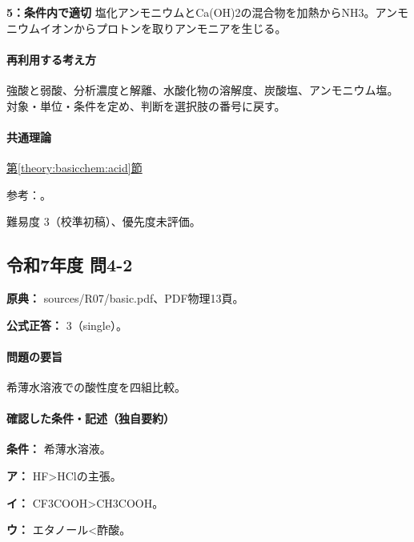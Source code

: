 \noindent\textbf{5：条件内で適切} 塩化アンモニウムとCa(OH)2の混合物を加熱からNH3。アンモニウムイオンからプロトンを取りアンモニアを生じる。\par

\paragraph{再利用する考え方} 強酸と弱酸、分析濃度と解離、水酸化物の溶解度、炭酸塩、アンモニウム塩。 対象・単位・条件を定め、判断を選択肢の番号に戻す。

\paragraph{共通理論} \hyperref[theory:basicchem:acid]{第\ref*{theory:basicchem:acid}節}

\par 参考：\cite{purdue_acid_strength,chem55_hydrolysis}。

\par 難易度 3（校準初稿）、優先度未評価。

\subsection{令和7年度 問4-2}
\label{q:r07-reg-basic-4-2}

\noindent\textbf{原典：} sources/R07/basic.pdf、PDF物理13頁。

\textbf{公式正答：} 3（single）。

\paragraph{問題の要旨} 希薄水溶液での酸性度を四組比較。

\paragraph{確認した条件・記述（独自要約）}\mbox{}\par

\noindent\textbf{条件：} 希薄水溶液。\par

\noindent\textbf{ア：} HF>HClの主張。\par

\noindent\textbf{イ：} CF3COOH>CH3COOH。\par

\noindent\textbf{ウ：} エタノール<酢酸。\par


